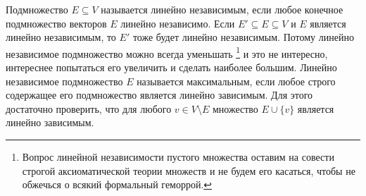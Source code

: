 Подмножество $E\subseteq V$ называется линейно независимым, если любое конечное подмножество векторов $E$ линейно независимо.
Если $E'\subseteq E\subseteq V$ и $E$ является линейно независимым, то $E'$ тоже будет линейно независимым.
Потому линейно независимое подмножество можно всегда уменьшать%
\footnote{Вопрос линейной независимости пустого множества оставим на совести строгой аксиоматической теории множеств и не будем его касаться, чтобы не обжечься о всякий формальный геморрой.}
и это не интересно, интереснее попытаться его увеличить и сделать наиболее большим.
Линейно независимое подмножество $E$ называется максимальным, если любое строго содержащее его подмножество является линейно зависимым.
Для этого достаточно проверить, что для любого $v\in V\setminus E$ множество $E\cup \{v\}$ является линейно зависимым.

